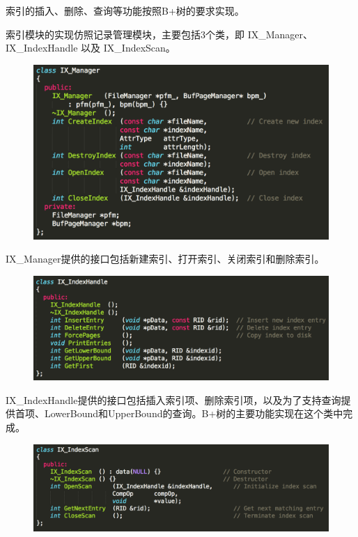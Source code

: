 索引的插入、删除、查询等功能按照B+树的要求实现。

索引模块的实现仿照记录管理模块，主要包括3个类，即 IX\_Manager、IX\_IndexHandle 以及 IX\_IndexScan。

\begin{figure}[H]
\centering
\includegraphics[width=4.5in]{Figures/IX_Manager.png}
\end{figure}

IX\_Manager提供的接口包括新建索引、打开索引、关闭索引和删除索引。

\begin{figure}[H]
\centering
\includegraphics[width=5.5in]{Figures/IX_IndexHandle.png}
\end{figure}

IX\_IndexHandle提供的接口包括插入索引项、删除索引项，以及为了支持查询提供首项、LowerBound和UpperBound的查询。B+树的主要功能实现在这个类中完成。

\begin{figure}[H]
\centering
\includegraphics[width=5.5in]{Figures/IX_IndexScan.png}
\end{figure}


